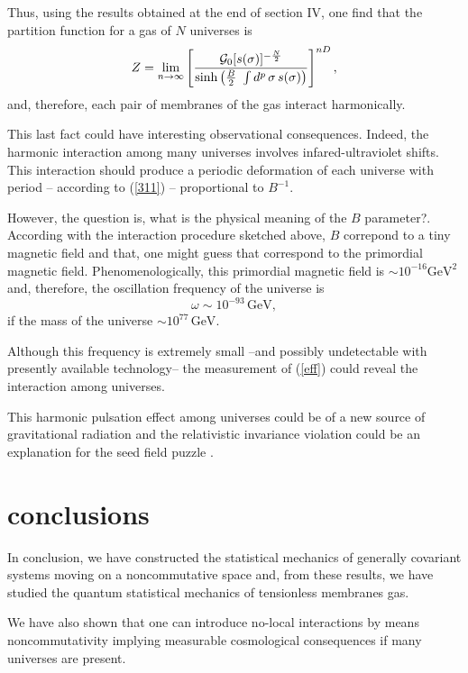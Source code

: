 \documentclass[a4paper,aps,twocolumn,amsfonts]{revtex4}
\begin{document}
   Thus, using the results obtained at the end of section IV, one find that the partition function for a gas of $N$ universes is
   \begin{equation}
   Z=  \lim_{n \to \infty}  \left[\frac{{\cal G}_0[s (\sigma)]^{-\frac{N }{2}}}{\sinh\left(\frac{B}{2}~\int
   d^p\,\sigma\, s (\sigma)\right)}\right]^{nD},  \label{311}
   \end{equation}
   and, therefore, each pair of membranes of the gas  interact harmonically.

   This last fact could have interesting observational consequences.  Indeed, the harmonic interaction among many universes involves infared-ultraviolet shifts. This interaction should  produce a periodic deformation of each universe with period -- according to (\ref{311}) --  proportional to $B^{-1}$.  
   
   However, the question is, what is the physical meaning of the $B$ parameter?. According with the interaction procedure sketched above, $B$ correpond   to a tiny magnetic field and that, one might guess  that correspond to the primordial magnetic field. Phenomenologically, this primordial magnetic field is  $\sim 10^{-16} \mbox{GeV}^2$ and, therefore, the oscillation frequency of the universe is 
   \begin{equation}
   \omega \sim 10^{-93} \, \mbox{GeV}, \label{eff}
   \end{equation}
   if the mass of the universe $\sim 10^{77} \,\mbox{GeV}$. 

   Although this frequency  is extremely small --and possibly undetectable with presently available technology-- the measurement of (\ref{eff}) could reveal the interaction among universes. 

   This  harmonic pulsation effect among universes could be of a new source of gravitational radiation and the relativistic invariance violation could be an explanation for the seed field puzzle \cite{ru}. 

   \section{conclusions}

   In conclusion, we have constructed the statistical mechanics of generally covariant systems moving on a noncommutative space and, from these results, we have studied the quantum statistical mechanics of tensionless membranes gas.

   We have also shown that one can  introduce no-local interactions by means noncommutativity  implying measurable cosmological consequences if many universes are present.
\end{document}
